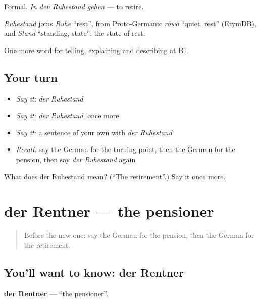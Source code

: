 Formal. \emph{In den Ruhestand gehen} — to retire.

\begin{cousinweb}
\emph{Ruhestand} joins \emph{Ruhe} \textquotedblleft{}rest\textquotedblright{}, from Proto-Germanic \emph{rōwō} \textquotedblleft{}quiet, rest\textquotedblright{} (EtymDB), and \emph{Stand} \textquotedblleft{}standing, state\textquotedblright{}: the state of rest.
\end{cousinweb}

\begin{grammarlens}[title={What you've built}]
One more word for telling, explaining and describing at B1.
\end{grammarlens}

\subsection*{Your turn}
\begin{itemize}
\raggedright
  \item \emph{Say it:} \emph{der Ruhestand}
  \item \emph{Say it:} \emph{der Ruhestand}, once more
  \item \emph{Say it:} a sentence of your own with \emph{der Ruhestand}
  \item \emph{Recall:} say the German for the turning point, then the German for the pension, then say \emph{der Ruhestand} again
\end{itemize}

\begin{tcolorbox}[breakable,colback=teal!4,colframe=teal!35!black,title={Before you move on}]
What does der Ruhestand mean? (\textquotedblleft{}The retirement\textquotedblright{}.) Say it once more.
\end{tcolorbox}
\section[der Rentner]{der Rentner — the pensioner}

\label{lesson:GE-C302-rentner}



\begin{quote}
Before the new one: say the German for the pension, then the German for the retirement.
\end{quote}

\subsection*{You'll want to know: der Rentner}
\textbf{der Rentner} — \textquotedblleft{}the pensioner\textquotedblright{}.

